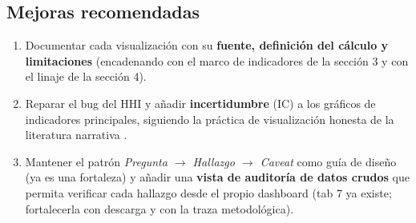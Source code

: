 \subsection{Mejoras recomendadas}

\begin{enumerate}
  \item Documentar cada visualización con su \textbf{fuente, definición del
        cálculo y limitaciones} (encadenando con el marco de indicadores de la
        sección 3 y con el linaje de la sección 4).
  \item Reparar el bug del HHI y añadir \textbf{incertidumbre} (IC) a los
        gráficos de indicadores principales, siguiendo la práctica de
        visualización honesta de la literatura narrativa \citep{segel2010narrative}.
  \item Mantener el patrón \emph{Pregunta $\rightarrow$ Hallazgo $\rightarrow$
        Caveat} como guía de diseño (ya es una fortaleza) y añadir una
        \textbf{vista de auditoría de datos crudos} que permita verificar cada
        hallazgo desde el propio dashboard (tab 7 ya existe; fortalecerla con
        descarga y con la traza metodológica).
\end{enumerate}
